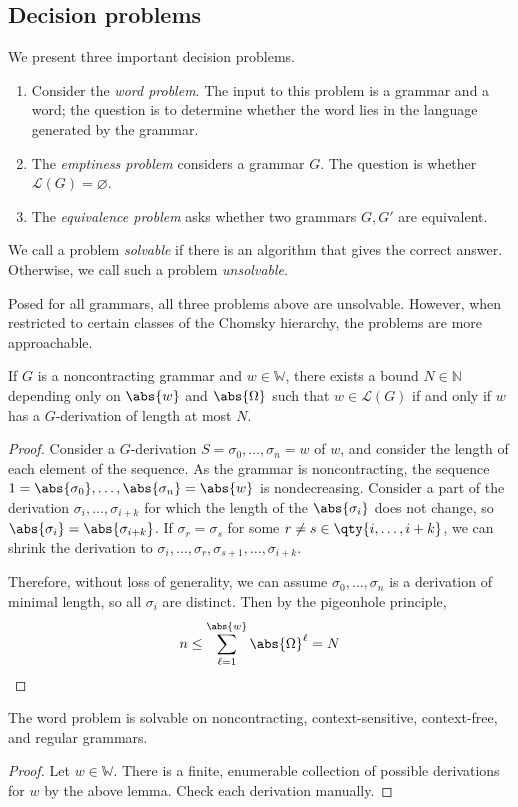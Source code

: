 \subsection{Decision problems}
We present three important decision problems.
\begin{enumerate}
	\item Consider the \emph{word problem}.
		The input to this problem is a grammar and a word; the question is to determine whether the word lies in the language generated by the grammar.
	\item The \emph{emptiness problem} considers a grammar \( G \).
		The question is whether \( \mathcal L(G) = \varnothing \).
	\item The \emph{equivalence problem} asks whether two grammars \( G, G' \) are equivalent.
\end{enumerate}
\begin{definition}
	We call a problem \emph{solvable} if there is an algorithm that gives the correct answer.
	Otherwise, we call such a problem \emph{unsolvable}.
\end{definition}
Posed for all grammars, all three problems above are unsolvable.
However, when restricted to certain classes of the Chomsky hierarchy, the problems are more approachable.
\begin{lemma}
	If \( G \) is a noncontracting grammar and \( w \in \mathbb W \), there exists a bound \( N \in \mathbb N \) depending only on \( \abs{w} \) and \( \abs{\Omega} \) such that \( w \in \mathcal L(G) \) if and only if \( w \) has a \( G \)-derivation of length at most \( N \).
\end{lemma}
\begin{proof}
	Consider a \( G \)-derivation \( S = \sigma_0, \dots, \sigma_n = w \) of \( w \), and consider the length of each element of the sequence.
	As the grammar is noncontracting, the sequence \( 1 = \abs{\sigma_0}, \dots, \abs{\sigma_n} = \abs{w} \) is nondecreasing.
	Consider a part of the derivation \( \sigma_i, \dots, \sigma_{i+k} \) for which the length of the \( \abs{\sigma_i} \) does not change, so \( \abs{\sigma_i} = \abs{\sigma_{i+k}} \).
	If \( \sigma_r = \sigma_s \) for some \( r \neq s \in \qty{i, \dots, i+k} \), we can shrink the derivation to \( \sigma_i, \dots, \sigma_r, \sigma_{s+1}, \dots, \sigma_{i+k} \).

	Therefore, without loss of generality, we can assume \( \sigma_0, \dots, \sigma_n \) is a derivation of minimal length, so all \( \sigma_i \) are distinct.
	Then by the pigeonhole principle,
	\[ n \leq \sum_{\ell=1}^{\abs{w}} \abs{\Omega}^\ell = N \]
\end{proof}
\begin{corollary}
	The word problem is solvable on noncontracting, context-sensitive, context-free, and regular grammars.
\end{corollary}
\begin{proof}
	Let \( w \in \mathbb W \).
	There is a finite, enumerable collection of possible derivations for \( w \) by the above lemma.
	Check each derivation manually.
\end{proof}

